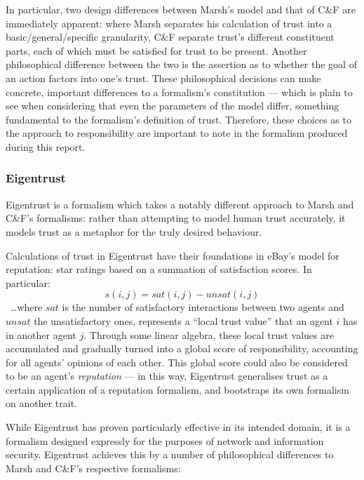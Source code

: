 In particular, two design differences between Marsh's model and that of C\&F are immediately apparent: where Marsh separates his calculation of trust into a basic/general/specific granularity, C\&F separate trust's different constituent parts, each of which must be satisfied for trust to be present. Another philosophical difference between the two is the assertion as to whether the goal of an action factors into one's trust. These philosophical decisions can make concrete, important differences to a formalism's constitution --- which is plain to see when considering that even the parameters of the model differ, something fundamental to the formalism's definition of trust. Therefore, these choices as to the approach to responsibility are important to note in the formalism produced during this report.\par

\subsubsection{Eigentrust}
Eigentrust\cite{eigentrust} is a formalism which takes a notably different approach to Marsh and C\&F's formalisms: rather than attempting to model human trust accurately, it models trust as a metaphor for the truly desired behaviour.\par

Calculations of trust in Eigentrust have their foundations in eBay's model for reputation: star ratings based on a summation of satisfaction scores. In particular: \[s(i,j) = sat(i,j) - unsat(i,j)\]~\ldots{}where \(sat\) is the number of satisfactory interactions between two agents and \(unsat\) the unsatisfactory ones, represents a ``local trust value'' that an agent \(i\) has in another agent \(j\). Through some linear algebra, these local trust values are accumulated and gradually turned into a global score of responsibility, accounting for all agents' opinions of each other. This global score could also be considered to be an agent's \emph{reputation} --- in this way, Eigentrust generalises trust as a certain application of a reputation formalism, and bootstraps its own formalism on another trait.\par

While Eigentrust has proven particularly effective in its intended domain, it is a formalism designed expressly for the purposes of network and information security. Eigentrust achieves this by a number of philosophical differences to Marsh and C\&F's respective formalisms:

